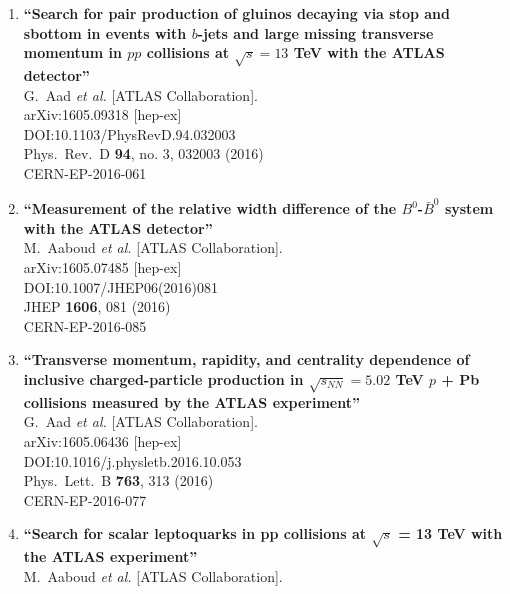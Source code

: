 \documentclass{article}
\begin{document}
\begin{enumerate}
\item%
{\bf ``Search for pair production of gluinos decaying via stop and sbottom in events with $b$-jets and large missing transverse momentum in $pp$ collisions at $\sqrt{s} = 13$ TeV with the ATLAS detector''}
  \\{}G.~Aad {\it et al.} [ATLAS Collaboration].
  \\{}arXiv:1605.09318 [hep-ex]
  \\{}DOI:10.1103/PhysRevD.94.032003
  \\{}Phys.\ Rev.\ D {\bf 94}, no. 3, 032003 (2016)
  \\{}CERN-EP-2016-061
\item%
{\bf ``Measurement of the relative width difference of the $B^0$-$\bar B^0$ system with the ATLAS detector''}
  \\{}M.~Aaboud {\it et al.} [ATLAS Collaboration].
  \\{}arXiv:1605.07485 [hep-ex]
  \\{}DOI:10.1007/JHEP06(2016)081
  \\{}JHEP {\bf 1606}, 081 (2016)
  \\{}CERN-EP-2016-085
\item%
{\bf ``Transverse momentum, rapidity, and centrality dependence of inclusive charged-particle production in $\sqrt{s_{NN}}=5.02$ TeV $p$ + Pb collisions measured by the ATLAS experiment''}
  \\{}G.~Aad {\it et al.} [ATLAS Collaboration].
  \\{}arXiv:1605.06436 [hep-ex]
  \\{}DOI:10.1016/j.physletb.2016.10.053
  \\{}Phys.\ Lett.\ B {\bf 763}, 313 (2016)
  \\{}CERN-EP-2016-077
\item%
{\bf ``Search for scalar leptoquarks in pp collisions at $\sqrt{s}$ = 13 TeV with the ATLAS experiment''}
  \\{}M.~Aaboud {\it et al.} [ATLAS Collaboration].

\end{enumerate}
\end{document}
